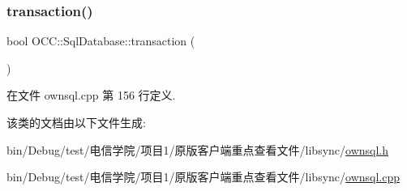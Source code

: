 \mbox{\label{class_o_c_c_1_1_sql_database_a4d06c7545e0a10d6957e972bc65e8215}} 
\subsubsection{\texorpdfstring{transaction()}{transaction()}}
{\footnotesize\ttfamily bool O\+C\+C\+::\+Sql\+Database\+::transaction (\begin{DoxyParamCaption}{ }\end{DoxyParamCaption})}



在文件 ownsql.\+cpp 第 156 行定义.



该类的文档由以下文件生成\+:\begin{DoxyCompactItemize}
\item 
bin/\+Debug/test/电信学院/项目1/原版客户端重点查看文件/libsync/\hyperlink{ownsql_8h}{ownsql.\+h}\item 
bin/\+Debug/test/电信学院/项目1/原版客户端重点查看文件/libsync/\hyperlink{ownsql_8cpp}{ownsql.\+cpp}\end{DoxyCompactItemize}
